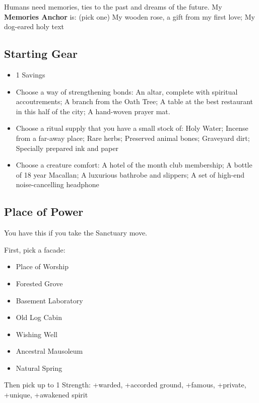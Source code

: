 \documentclass[
  oneside,
  statementpaper,
  9pt]{memoir}
\begin{document}
Humans need memories, ties to the past and dreams of the future. My
\textbf{Memories Anchor} is: (pick one) My wooden rose, a gift from my
first love; My dog-eared holy text

\hypertarget{starting-gear-4}{%
\subsection{Starting Gear}\label{starting-gear-4}}

\begin{itemize}
\tightlist
\item
  1 Savings
\item
  Choose a way of strengthening bonds: An altar, complete with spiritual
  accoutrements; A branch from the Oath Tree; A table at the best
  restaurant in this half of the city; A hand-woven prayer mat.
\item
  Choose a ritual supply that you have a small stock of: Holy Water;
  Incense from a far-away place; Rare herbs; Preserved animal bones;
  Graveyard dirt; Specially prepared ink and paper
\item
  Choose a creature comfort: A hotel of the month club membership; A
  bottle of 18 year Macallan; A luxurious bathrobe and slippers; A set
  of high-end noise-cancelling headphone
\end{itemize}

\hypertarget{place-of-power-3}{%
\subsection{Place of Power}\label{place-of-power-3}}

You have this if you take the Sanctuary move.

First, pick a facade:

\begin{itemize}
\tightlist
\item
  Place of Worship
\item
  Forested Grove
\item
  Basement Laboratory
\item
  Old Log Cabin
\item
  Wishing Well
\item
  Ancestral Mausoleum
\item
  Natural Spring
\end{itemize}

Then pick up to 1 Strength: +warded, +accorded ground, +famous,
+private, +unique, +awakened spirit
\end{document}
